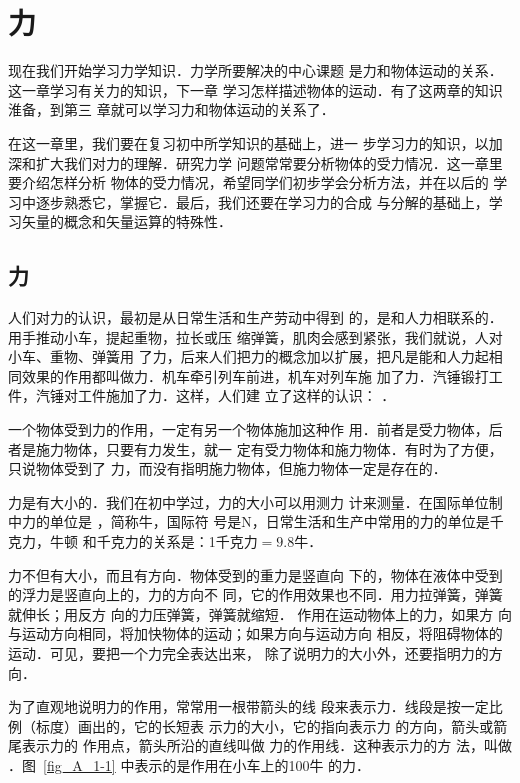 \chapter{力}\label{chapter-force}

    现在我们开始学习力学知识．力学所要解决的中心课题
是力和物体运动的关系．这一章学习有关力的知识，下一章
学习怎样描述物体的运动．有了这两章的知识淮备，到第三
章就可以学习力和物体运动的关系了．

    在这一章里，我们要在复习初中所学知识的基础上，进一
步学习力的知识，以加深和扩大我们对力的理解．研究力学
问题常常要分析物体的受力情况．这一章里要介绍怎样分析
物体的受力情况，希望同学们初步学会分析方法，并在以后的
学习中逐步熟悉它，掌握它．最后，我们还要在学习力的合成
与分解的基础上，学习矢量的概念和矢量运算的特殊性．


\section{力} 
    人们对力的认识，最初是从日常生活和生产劳动中得到
的，是和人力相联系的．用手推动小车，提起重物，拉长或压
缩弹簧，肌肉会感到紧张，我们就说，人对小车、重物、弹簧用
了力，后来人们把力的概念加以扩展，把凡是能和人力起相
同效果的作用都叫做力．机车牵引列车前进，机车对列车施
加了力．汽锤锻打工件，汽锤对工件施加了力．这样，人们建
立了这样的认识： ．

一个物体受到力的作用，一定有另一个物体施加这种作
用．前者是受力物体，后者是施力物体，只要有力发生，就一
定有受力物体和施力物体．有时为了方便，只说物体受到了
力，而没有指明施力物体，但施力物体一定是存在的．

    力是有大小的．我们在初中学过，力的大小可以用测力
计来测量．在国际单位制中力的单位是 ，简称牛，国际符
号是N，日常生活和生产中常用的力的单位是千克力，牛顿
和千克力的关系是：1千克力$=9.8$牛．

    力不但有大小，而且有方向．物体受到的重力是竖直向
下的，物体在液体中受到的浮力是竖直向上的，力的方向不
同，它的作用效果也不同．用力拉弹簧，弹簧就伸长；用反方
向的力压弹簧，弹簧就缩短．
作用在运动物体上的力，如果方
向与运动方向相同，将加快物体的运动；如果方向与运动方向
相反，将阻碍物体的运动．可见，要把一个力完全表达出来，
除了说明力的大小外，还要指明力的方向．

为了直观地说明力的作用，常常用一根带箭头的线
段来表示力．线段是按一定比
例（标度）画出的，它的长短表
示力的大小，它的指向表示力
的方向，箭头或箭尾表示力的
作用点，箭头所沿的直线叫做
力的作用线．这种表示力的方
法，叫做 ．图~\ref{fig_A_1-1} 中表示的是作用在小车上的100牛
的力．

